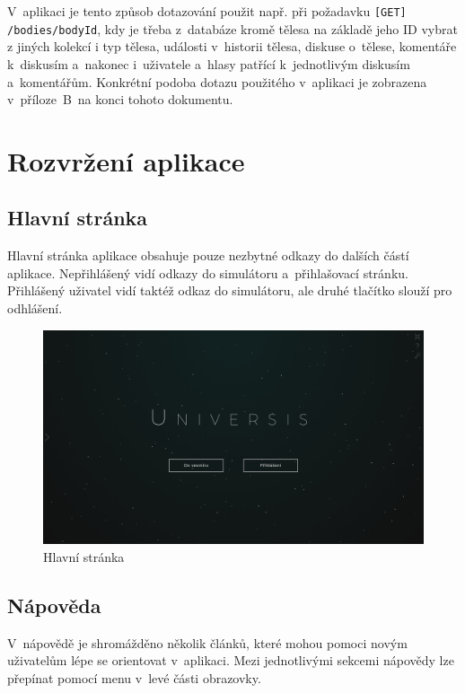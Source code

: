 \documentclass[a4paper,12pt]{article}
\def\code#1{\texttt{#1}}
\begin{document}
V~aplikaci je tento způsob dotazování použit např. při požadavku \code{[GET] /bodies/{bodyId}}, kdy je třeba z~databáze kromě tělesa na základě jeho ID vybrat z jiných kolekcí i typ tělesa, události v~historii tělesa, diskuse o~tělese, komentáře k~diskusím a~nakonec i~uživatele a~hlasy patřící k~jednotlivým diskusím a~komentářům. Konkrétní podoba dotazu použitého v~aplikaci je zobrazena v~příloze~B~na konci tohoto dokumentu.

\section{Rozvržení aplikace}

\subsection{Hlavní stránka}

Hlavní stránka aplikace obsahuje pouze nezbytné odkazy do dalších částí aplikace. Nepřihlášený vidí odkazy do simulátoru a~přihlašovací stránku. Přihlášený uživatel vidí taktéž odkaz do simulátoru, ale druhé tlačítko slouží pro odhlášení.

\begin{figure}[H]
\begin{center}
\includegraphics[width=450pt]{Images/MainPage.png}
\caption{Hlavní stránka}
\label{BodiesList}
\end{center}
\end{figure}

\subsection{Nápověda}

V~nápovědě je shromážděno několik článků, které mohou pomoci novým uživatelům lépe se orientovat v~aplikaci. Mezi jednotlivými sekcemi nápovědy lze přepínat pomocí menu v~levé části obrazovky.
\end{document}
